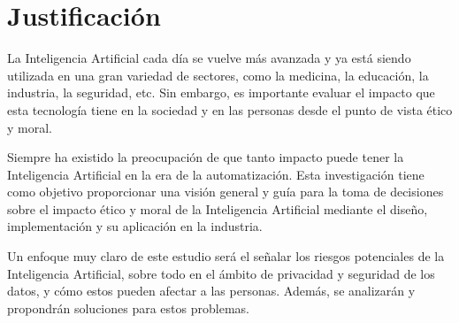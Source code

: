   \section{Justificación}
  La Inteligencia Artificial cada día se vuelve más avanzada y ya está siendo utilizada en una gran
  variedad de sectores, como la medicina, la educación, la industria, la seguridad, etc. Sin embargo,
  es importante evaluar el impacto que esta tecnología tiene en la sociedad y en las personas desde
  el punto de vista ético y moral.

  Siempre ha existido la preocupación de que tanto impacto puede tener la Inteligencia Artificial en
  la era de la automatización. Esta investigación tiene como objetivo proporcionar una visión general
  y guía para la toma de decisiones sobre el impacto ético y moral de la Inteligencia Artificial
  mediante el diseño, implementación y su aplicación en la industria.

  Un enfoque muy claro de este estudio será el señalar los riesgos potenciales de la Inteligencia
  Artificial, sobre todo en el ámbito de privacidad y seguridad de los datos, y cómo estos pueden
  afectar a las personas. Además, se analizarán y propondrán soluciones para estos problemas.

  



  

